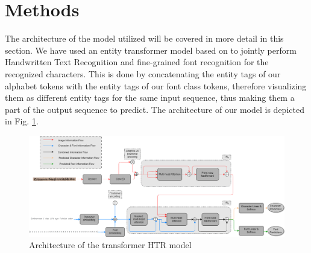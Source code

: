 \documentclass[conference]{IEEEtran}
\begin{document}
\section{Methods}
The architecture of the model utilized will be covered in more detail in this section. We have used an entity transformer model based on \cite{rouhoua2021transformerbased} to jointly perform Handwritten Text Recognition and fine-grained font recognition for the recognized characters. This is done by concatenating the entity tags of our alphabet tokens with the entity tags of our font class tokens, therefore visualizing them as different entity tags for the same input sequence, thus making them a part of the output sequence to predict. The architecture of our model is depicted in Fig. \ref{htr_arch}.
\begin{figure}[htbp]
    \centering
    \includegraphics[width=1.0\textwidth]{figures/HTRModelArchitecture.png}
    \caption{Architecture of the transformer HTR model}
    \label{htr_arch}
\end{figure}
\end{document}
